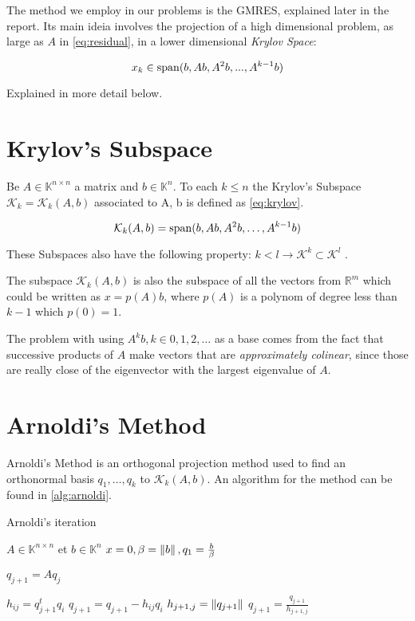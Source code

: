 The method we employ in our problems is the GMRES, explained later in the report. Its main ideia involves the projection of a high dimensional problem, as large as $A$ in \ref{eq:residual}, in a lower dimensional \textit{Krylov Space}:

\begin{equation}\label{eq:xkry}
    x_{k} \in \operatorname{span}(b,Ab,A^{2}b,...,A^{k-1}b)
\end{equation}

Explained in more detail below.

\section{Krylov's Subspace}
Be $A \in \mathbb{K}^{n \times n}$ a matrix and $b\in \mathbb{K}^{n}$. To each $k\leq n$ the Krylov's Subspace $\mathcal{K}_{k}=\mathcal{K}_{k}(A,b)$ associated to A, b is defined as \ref{eq:krylov}.

\begin{equation}\label{eq:krylov}
    \mathcal{K}_{k}(A,b) = \operatorname{span}(b,Ab,A^{2}b,\dots , A^{k-1}b)
\end{equation}

These Subspaces also have the following property: $k<l \to \mathcal{K}^{k} \subset \mathcal{K}^{l}$ \cite{bonnet}.

The subspace $\mathcal{K}_{k}(A,b)$ is also the subspace of all the vectors from $\mathbb{R}^{m}$ which could be written as $x=p(A)b$, where $p(A)$ is a polynom of degree less than $k-1$ which $p(0)=1$.

The problem with using ${A^{k}b}, k \in {0,1,2,\dots}$ as a base comes from the fact that successive products of $A$ make vectors that are \textit{approximately colinear}, since those are really close of the eigenvector with the largest eigenvalue of $A$.

\section{Arnoldi's Method}


Arnoldi's Method is an orthogonal projection method used to find an orthonormal basis ${q_{1}, \dots, q_{k}}$ to $\mathcal{K}_{k}(A,b)$. An algorithm for the method can be found in \ref{alg:arnoldi}.


\begin{algorithm}
    \caption{Arnoldi's iteration}\label{alg:arnoldi}
    \begin{algorithmic}[1]
        \State $A \in \mathbb{K}^{n \times n}$ et $b\in \mathbb{K}^{n}$
        \State $x=0, \beta=\left\lVert b\right\rVert,q_{1}=\frac{b}{\beta}$

        \State $q_{j+1} = Aq_{j}$

        \State $h_{ij}= q_{j+1}^{t}q_{i}$
        \State $q_{j+1} = q_{j+1} - h_{ij}q_{i}$
        \EndFor
        \State $h_{j+1,j}=\left\lVert q_{j+1}\right\rVert$
        \State $q_{j+1} = \frac{q_{j+1}}{h_{j+1,j}}$
        \EndFor

    \end{algorithmic}
\end{algorithm}

